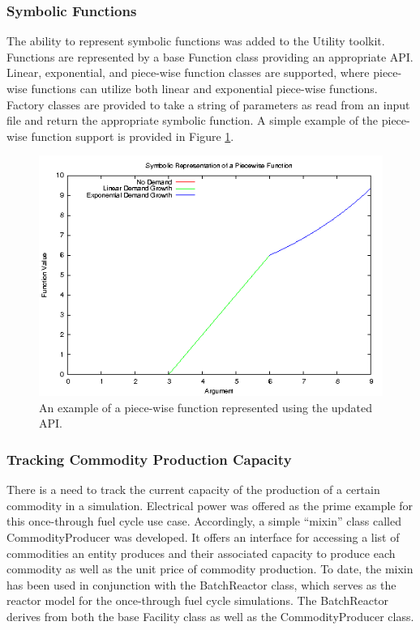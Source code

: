 \subsubsection{Symbolic Functions}

The ability to represent symbolic functions was added to the \Cyclus Utility
toolkit. Functions are represented by a base Function class providing an
appropriate API. Linear, exponential, and piece-wise function classes are
supported, where piece-wise functions can utilize both linear and exponential
piece-wise functions. Factory classes are provided to take a string of parameters
as read from an input file and return the appropriate symbolic function. A
simple example of the piece-wise function support is provided in Figure
\ref{fig:piecewise}.

\begin{figure}[H]
  \begin{center}
    \includegraphics[width=\linewidth]{./chapters/prevwork/piecewise.png}
  \caption{An example of a piece-wise function represented using the updated API.}
  \label{fig:piecewise}
  \end{center}
\end{figure}

\subsubsection{Tracking Commodity Production Capacity}

There is a need to track the current capacity of the production of a certain
commodity in a simulation. Electrical power was offered as the prime example for
this once-through fuel cycle use case. Accordingly, a simple ``mixin'' class
\cite{ulrich_mixin-based_2001} called CommodityProducer was developed. It offers
an interface for accessing a list of commodities an entity produces and their
associated capacity to produce each commodity as well as the unit price of
commodity production. To date, the mixin has been used in conjunction with the
BatchReactor class, which serves as the reactor model for the once-through fuel
cycle simulations. The BatchReactor derives from both the base Facility class
as well as the CommodityProducer class.

